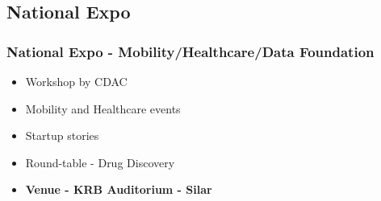 \documentclass[aspectratio=169]{beamer}
\begin{document}
\subsection{National Expo}
\begin{frame}[fragile=singleslide]{\insertsubsectionhead}
  \frametitle {National Expo - Mobility/Healthcare/Data Foundation}
\begin{center}
\begin{itemize}
\item Workshop by CDAC
\item Mobility  and Healthcare events
\item Startup stories
\item Round-table - Drug Discovery
\item \textbf{Venue - KRB Auditorium - Silar}
\end{itemize}
\end{center}
\end{frame}
\end{document}
